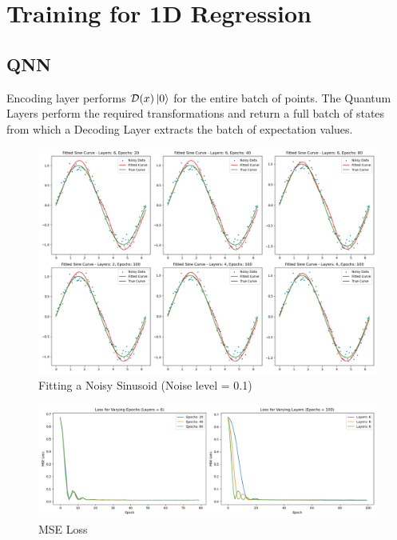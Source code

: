 \documentclass[11pt,oneside]{article}
\theoremstyle{definition}
\theoremstyle{definition}
\newcommand{\D}{\mathcal{D}}
\begin{document}
\FloatBarrier

\section{Training for 1D Regression}

\subsection{QNN}

Encoding layer performs $\D(x)\ket{0}$ for the entire batch of points. The Quantum Layers perform the required transformations and return a full batch of states from which a Decoding Layer extracts the batch of expectation values.

\begin{figure}[hbt!]
    \centering
    \includegraphics[width=\textwidth]{images/fits.png}
    \caption{Fitting a Noisy Sinusoid (Noise level = 0.1)}
    \label{t1}
\end{figure}

\begin{figure}[hbt!]
    \centering
    \includegraphics[width=\textwidth]{images/mses.png}
    \caption{MSE Loss}
    \label{t2}
\end{figure}
\end{document}
